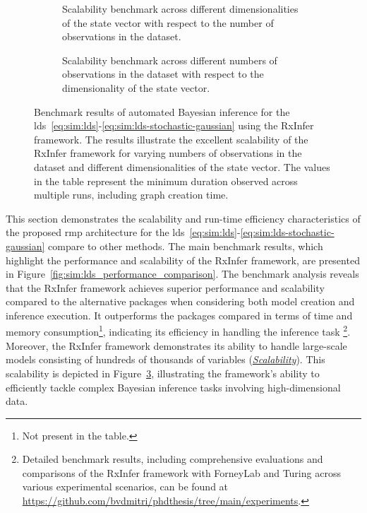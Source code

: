 \begin{figure}
  \centering
  \begin{subfigure}[t]{\textwidth}
    \centering
    \caption{Scalability benchmark across different dimensionalities of the state vector with respect to the number of observations in the dataset.
    }
    \label{fig:sim:lds_scalability_size}
  \end{subfigure}
  \hfill
  \begin{subfigure}[t]{\textwidth}
    \centering
    \caption{Scalability benchmark across different numbers of observations in the dataset with respect to the dimensionality of the state vector.}
    \label{fig:sim:lds_scalability_dims}
  \end{subfigure}
  \hfill \caption{
    Benchmark results of automated Bayesian inference for the \ac{lds}~\eqref{eq:sim:lds}-\eqref{eq:sim:lds-stochastic-gaussian} using the RxInfer framework.
    The results illustrate the excellent scalability of the RxInfer framework for varying numbers
    of observations in the dataset and different dimensionalities of the state vector.
    The values in the table represent the minimum duration observed across multiple runs,
    including graph creation time.
  }
  \label{fig:sim:lds_scalability}
\end{figure}

This section demonstrates the scalability and run-time efficiency characteristics of the proposed \ac{rmp} architecture for the \ac{lds}~\eqref{eq:sim:lds}-\eqref{eq:sim:lds-stochastic-gaussian} compare to other methods.
The main benchmark results, which highlight the performance and scalability of the RxInfer
framework, are presented in Figure~\ref{fig:sim:lds_performance_comparison}.
The benchmark analysis reveals that the RxInfer framework achieves superior performance and
scalability compared to the alternative packages when considering both model creation and
inference execution.
It outperforms the packages compared in terms of time and memory consumption\footnote{Not
  present in the table.
}, indicating its
efficiency in handling the inference task \footnote{Detailed benchmark results,
  including comprehensive evaluations and comparisons of the RxInfer framework with ForneyLab
  and Turing across various experimental scenarios, can be found at
  \url{https://github.com/bvdmitri/phdthesis/tree/main/experiments}.
}.
Moreover, the RxInfer framework demonstrates its ability to handle large-scale models
consisting of hundreds of thousands of variables (\hyperlink{experiments:scalability}{\emph{Scalability}}).
This scalability is depicted in Figure~\ref{fig:sim:lds_scalability}, illustrating the
framework's ability to efficiently tackle complex Bayesian inference tasks involving
high-dimensional data.

